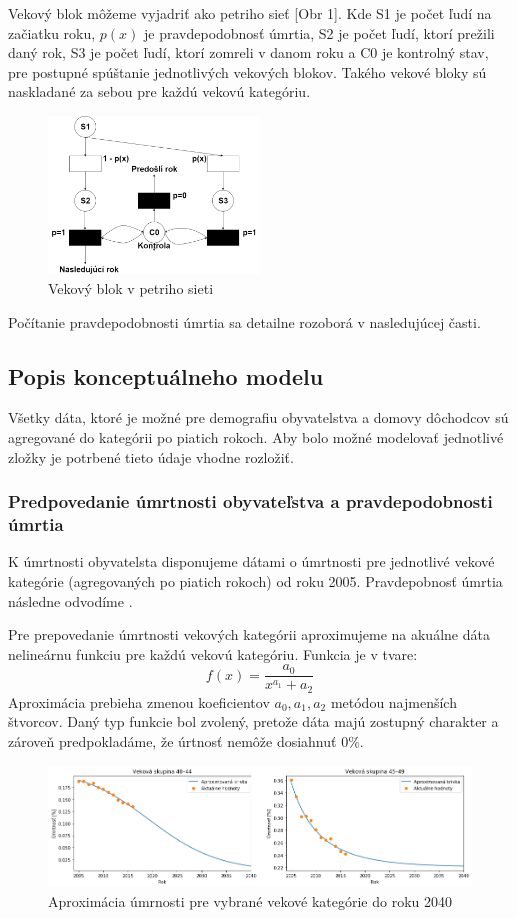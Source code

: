 \documentclass[a4paper, 11pt]{article}
\begin{document}
Vekový blok môžeme vyjadriť ako petriho sieť [Obr 1]. Kde S1 je počet ľudí na začiatku roku, $p(x)$ je pravdepodobnosť úmrtia, S2 je počet ľudí, ktorí prežili daný rok, S3 je počet ľudí, ktorí zomreli v danom roku a C0 je kontrolný stav, pre postupné spúštanie jednotlivých vekových blokov. Takého vekové bloky sú naskladané za sebou pre každú vekovú kategóriu.
\renewcommand{\figurename}{Obr}
\begin{figure}[H]
\centering
\includegraphics[width=0.5\textwidth]{petri}
\caption{Vekový blok v petriho sieti}
\end{figure}
Počítanie pravdepodobnosti úmrtia sa detailne rozoborá v nasledujúcej časti.


\subsection{Popis konceptuálneho modelu}
Všetky dáta, ktoré je možné pre demografiu obyvatelstva a domovy dôchodcov sú agregované do kategórii po piatich rokoch. Aby bolo možné modelovať jednotlivé zložky je potrbené tieto údaje vhodne rozložiť.

\subsubsection*{Predpovedanie úmrtnosti obyvateľstva a pravdepodobnosti úmrtia}
K úmrtnosti obyvatelsta disponujeme dátami o úmrtnosti pre jednotlivé vekové kategórie (agregovaných po piatich rokoch) od roku 2005. Pravdepobnosť úmrtia následne odvodíme \cite{prob}.

Pre prepovedanie úmrtnosti vekových kategórii aproximujeme na akuálne dáta nelineárnu funkciu pre každú vekovú kategóriu. Funkcia je v tvare:
$$f(x)=\frac{a_0}{x^{a_1} + a_2}$$
Aproximácia prebieha zmenou koeficientov $a_0, a_1, a_2$ metódou najmenších štvorcov\cite{spline}. Daný typ funkcie bol zvolený, pretože dáta majú zostupný charakter a zároveň predpokladáme, že úrtnosť nemôže dosiahnuť 0\%.
\begin{figure}[H]
\centering
\includegraphics[width=1\textwidth]{exp_1}
\caption{Aproximácia úmrnosti pre vybrané vekové kategórie do roku 2040}
\end{figure}
\end{document}
